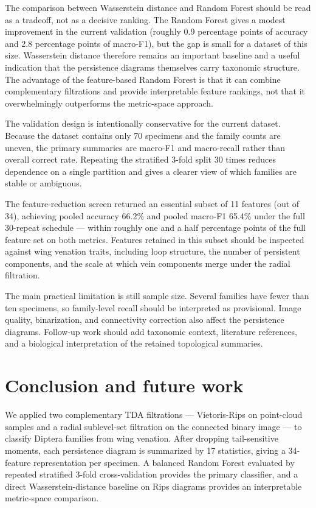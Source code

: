\documentclass[
  a4paper,
  DIV=11,
  numbers=noendperiod]{scrartcl}
\begin{document}
The comparison between Wasserstein distance and Random Forest should be
read as a tradeoff, not as a decisive ranking. The Random Forest gives a
modest improvement in the current validation (roughly 0.9 percentage
points of accuracy and 2.8 percentage points of macro-F1), but the gap
is small for a dataset of this size. Wasserstein distance therefore
remains an important baseline and a useful indication that the
persistence diagrams themselves carry taxonomic structure. The advantage
of the feature-based Random Forest is that it can combine complementary
filtrations and provide interpretable feature rankings, not that it
overwhelmingly outperforms the metric-space approach.

The validation design is intentionally conservative for the current
dataset. Because the dataset contains only 70 specimens and the family
counts are uneven, the primary summaries are macro-F1 and macro-recall
rather than overall correct rate. Repeating the stratified 3-fold split
30 times reduces dependence on a single partition and gives a clearer
view of which families are stable or ambiguous.

The feature-reduction screen returned an essential subset of 11 features
(out of 34), achieving pooled accuracy 66.2\% and pooled macro-F1 65.4\%
under the full 30-repeat schedule --- within roughly one and a half
percentage points of the full feature set on both metrics. Features
retained in this subset should be inspected against wing venation
traits, including loop structure, the number of persistent components,
and the scale at which vein components merge under the radial
filtration.

The main practical limitation is still sample size. Several families
have fewer than ten specimens, so family-level recall should be
interpreted as provisional. Image quality, binarization, and
connectivity correction also affect the persistence diagrams. Follow-up
work should add taxonomic context, literature references, and a
biological interpretation of the retained topological summaries.

\section{Conclusion and future work}\label{conclusion-and-future-work}

We applied two complementary TDA filtrations --- Vietoris-Rips on
point-cloud samples and a radial sublevel-set filtration on the
connected binary image --- to classify Diptera families from wing
venation. After dropping tail-sensitive moments, each persistence
diagram is summarized by 17 statistics, giving a 34-feature
representation per specimen. A balanced Random Forest evaluated by
repeated stratified 3-fold cross-validation provides the primary
classifier, and a direct Wasserstein-distance baseline on Rips diagrams
provides an interpretable metric-space comparison.
\end{document}
